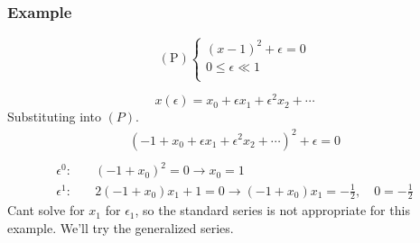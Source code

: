 \documentclass[12pt]{article}
\begin{document}
\subsubsection{Example}
\begin{equation*} (\text{P}) \left\{
  \begin{aligned}
    (x-1)^2+\epsilon=0 \\
    0\le\epsilon\ll1 \\
  \end{aligned} \right.
\end{equation*}

\begin{equation*}
  x(\epsilon) = x_0 + \epsilon x_1 + \epsilon^2 x_2 + \cdots
\end{equation*}
Substituting into $(P)$.
\begin{equation*}
  \begin{aligned}
    (-1+x_0+\epsilon x_1+\epsilon^2 x_2+\cdots)^2 + \epsilon = 0 \\
  \end{aligned}
\end{equation*}
\begin{equation*}
  \begin{aligned}
    \epsilon^0:&\quad (-1+x_0)^2=0\longrightarrow x_0=1 \\
    \epsilon^1:&\quad 2(-1+x_0)x_1+1=0\longrightarrow (-1+x_0)x_1=-\frac{1}{2},\quad 0=-\frac{1}{2}
  \end{aligned}
\end{equation*}
Cant solve for $x_1$ for $\epsilon_1$, so the standard series is not appropriate
for this example. We'll try the generalized series.
\end{document}
